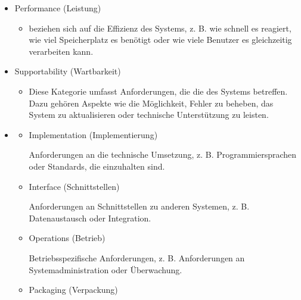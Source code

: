 \begin{defBox}[title=Classification \& Organization]
\begin{itemize}
\begin{infoBox}
\begin{itemize}
            \end{itemize}
        \end{infoBox}
        \item Performance (Leistung)
        \begin{infoBox}
            \begin{itemize}
                \item {} beziehen sich auf die Effizienz des Systems, z. B. wie schnell es reagiert, wie viel Speicherplatz es benötigt oder wie viele Benutzer es gleichzeitig verarbeiten kann.
            \end{itemize}
        \end{infoBox}
        \item Supportability (Wartbarkeit)
        \begin{infoBox}
            \begin{itemize}
                \item Diese Kategorie umfasst Anforderungen, die die  des Systems betreffen. Dazu gehören Aspekte wie die Möglichkeit, Fehler zu beheben, das System zu aktualisieren oder technische Unterstützung zu leisten.
            \end{itemize}
        \end{infoBox}
    \item \fatsf{\red{+}}
        \begin{itemize}
            \item Implementation (Implementierung)
            \begin{infoBox}
                Anforderungen an die technische Umsetzung, z. B. Programmiersprachen oder Standards, die einzuhalten sind.
            \end{infoBox}
            \item Interface (Schnittstellen)
            \begin{infoBox}
                Anforderungen an Schnittstellen zu anderen Systemen, z. B. Datenaustausch oder Integration.
            \end{infoBox}
            \item Operations (Betrieb)
            \begin{infoBox}
                Betriebsspezifische Anforderungen, z. B. Anforderungen an Systemadministration oder Überwachung.
            \end{infoBox}
            \item Packaging (Verpackung)
            \begin{infoBox}

\end{infoBox}
\end{itemize}
\end{itemize}
\end{defBox}
